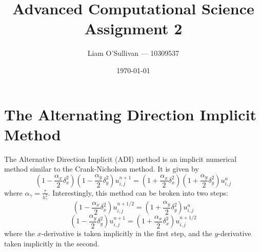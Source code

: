 \documentclass{article}
\title{Advanced Computational Science Assignment 2}
\author{Liam O'Sullivan --- 10309537}
\date{\today}
\newcommand{\uhalf}{u^{n+1/2}}
\begin{document}
\maketitle
\thispagestyle{empty}

\section*{The Alternating Direction Implicit Method}
The Alternative Direction Implicit (ADI) method is an implicit numerical method similar to the
Crank-Nicholson method. It is given by
\begin{equation}
  (1 - \frac{\alpha_x}{2}\delta^2_x)(1 - \frac{\alpha_y}{2}\delta^2_y) u_{i,j}^{n+1} = 
  (1 + \frac{\alpha_x}{2}\delta^2_x)(1 + \frac{\alpha_y}{2}\delta^2_y) u_{i,j}^n
\end{equation}
where $\alpha_\gamma = \frac{\tau}{h_\gamma^2}$.
Interestingly, this method can be broken into two steps:
$$
  (1 - \frac{\alpha_x}{2}\delta^2_x)\uhalf_{i,j} = 
  (1 + \frac{\alpha_y}{2}\delta^2_y) u_{i,j}^n
$$
$$
  (1 - \frac{\alpha_y}{2}\delta^2_y)u_{i,j}^{n+1} = 
  (1 + \frac{\alpha_x}{2}\delta^2_x) \uhalf_{i,j}
$$
where the $x$-derivative is taken implicitly in the first step, and the $y$-derivative taken implicitly
in the second.
\end{document}
